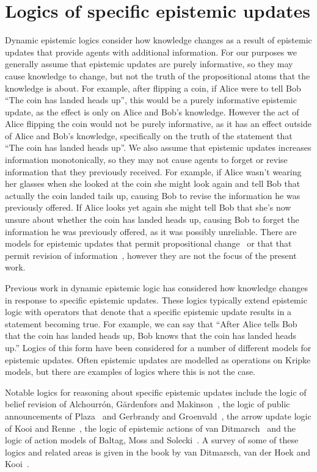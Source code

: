 \section{Logics of specific epistemic updates}

Dynamic epistemic logics consider how knowledge changes as a result of epistemic updates that provide agents with additional information.
For our purposes we generally assume that epistemic updates are purely informative, so they may cause knowledge to change, but not the truth of the propositional atoms that the knowledge is about.
For example, after flipping a coin, if Alice were to tell Bob ``The coin has landed heads up'', this would be a purely informative epistemic update, as the effect is only on Alice and Bob's knowledge.
However the act of Alice flipping the coin would not be purely informative, as it has an effect outside of Alice and Bob's knowledge, specifically on the truth of the statement that ``The coin has landed heads up''.
We also assume that epistemic updates increases information monotonically, so they may not cause agents to forget or revise information that they previously received.
For example, if Alice wasn't wearing her glasses when she looked at the coin she might look again and tell Bob that actually the coin landed tails up, causing Bob to revise the information he was previously offered.
If Alice looks yet again she might tell Bob that she's now unsure about whether the coin has landed heads up, causing Bob to forget the information he was previously offered, as it was possibly unreliable.
There are models for epistemic updates that permit propositional change~\cite{vanbenthem:2006} or that that permit revision of information~\cite{alchourron:1985}, however they are not the focus of the present work.

Previous work in dynamic epistemic logic has considered how knowledge changes in response to specific epistemic updates.
These logics typically extend epistemic logic with operators that denote that a specific epistemic update results in a statement becoming true.
For example, we can say that ``After Alice tells Bob that the coin has landed heads up, Bob knows that the coin has landed heads up.''
Logics of this form have been considered for a number of different models for epistemic updates.
Often epistemic updates are modelled as operations on Kripke models, but there are examples of logics where this is not the case.

Notable logics for reasoning about specific epistemic updates include the logic of belief revision of Alchourr{\'o}n, G{\"a}rdenfors and Makinson~\cite{alchourron:1985}, the logic of public announcements of Plaza~\cite{plaza:1989} and Gerbrandy and Groenvald~\cite{gerbrandy:1997}, the arrow update logic of Kooi and Renne~\cite{kooi:2011a}, the logic of epistemic actions of van Ditmarsch~\cite{vanditmarsch:1999, vanditmarsch:2000, vanditmarsch:2002} and the logic of action models of Baltag, Moss and Solecki~\cite{baltag:1999, baltag:2004}.
A survey of some of these logics and related areas is given in the book by van Ditmarsch, van der Hoek and Kooi~\cite{vanditmarsch:2007}.

